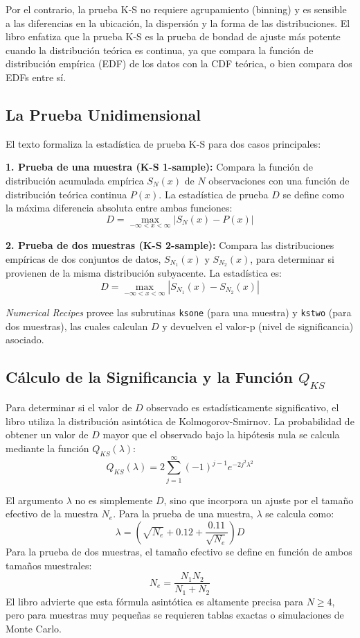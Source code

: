 \documentclass[a4paper]{article}
\begin{document}
Por el contrario, la prueba K-S no requiere agrupamiento (binning) y es sensible a las diferencias en la ubicación, la dispersión y la forma de las distribuciones. El libro enfatiza que la prueba K-S es la prueba de bondad de ajuste más potente cuando la distribución teórica es continua, ya que compara la función de distribución empírica (EDF) de los datos con la CDF teórica, o bien compara dos EDFs entre sí.

\subsection{La Prueba Unidimensional}

El texto formaliza la estadística de prueba K-S para dos casos principales:

\textbf{1. Prueba de una muestra (K-S 1-sample):} Compara la función de distribución acumulada empírica $S_N(x)$ de $N$ observaciones con una función de distribución teórica continua $P(x)$. La estadística de prueba $D$ se define como la máxima diferencia absoluta entre ambas funciones:
$$ D = \max_{-\infty < x < \infty} |S_N(x) - P(x)| $$

\textbf{2. Prueba de dos muestras (K-S 2-sample):} Compara las distribuciones empíricas de dos conjuntos de datos, $S_{N_1}(x)$ y $S_{N_2}(x)$, para determinar si provienen de la misma distribución subyacente. La estadística es:
$$ D = \max_{-\infty < x < \infty} |S_{N_1}(x) - S_{N_2}(x)| $$

\textit{Numerical Recipes} provee las subrutinas \texttt{ksone} (para una muestra) y \texttt{kstwo} (para dos muestras), las cuales calculan $D$ y devuelven el valor-p (nivel de significancia) asociado.

\subsection{Cálculo de la Significancia y la Función $Q_{KS}$}

Para determinar si el valor de $D$ observado es estadísticamente significativo, el libro utiliza la distribución asintótica de Kolmogorov-Smirnov. La probabilidad de obtener un valor de $D$ mayor que el observado bajo la hipótesis nula se calcula mediante la función $Q_{KS}(\lambda)$:
$$ Q_{KS}(\lambda) = 2 \sum_{j=1}^{\infty} (-1)^{j-1} e^{-2j^2\lambda^2} $$

El argumento $\lambda$ no es simplemente $D$, sino que incorpora un ajuste por el tamaño efectivo de la muestra $N_e$. Para la prueba de una muestra, $\lambda$ se calcula como:
$$ \lambda = \left( \sqrt{N_e} + 0.12 + \frac{0.11}{\sqrt{N_e}} \right) D $$
Para la prueba de dos muestras, el tamaño efectivo se define en función de ambos tamaños muestrales:
$$ N_e = \frac{N_1 N_2}{N_1 + N_2} $$
El libro advierte que esta fórmula asintótica es altamente precisa para $N \geq 4$, pero para muestras muy pequeñas se requieren tablas exactas o simulaciones de Monte Carlo.
\end{document}
